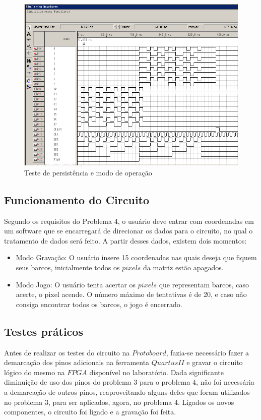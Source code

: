 \documentclass[12pt]{article}
\begin{document}
\begin{figure}[h]
\centering
\includegraphics[width=1\textwidth]{img/testram2.png}
\caption{Teste de persistência e modo de operação}
\label{fig:ramtest2}
\end{figure}

\subsection{Funcionamento do Circuito}
Segundo os requisitos do Problema 4, o usuário deve entrar com coordenadas em um software que se encarregará de direcionar os dados para o circuito, no qual o tratamento de dados será feito. A partir desses dados, existem dois momentos:

\begin{itemize}
\item Modo Gravação: O usuário insere 15 coordenadas nas quais deseja que fiquem seus barcos, inicialmente todos os $pixels$ da matriz estão apagados.
\item Modo Jogo: O usuário tenta acertar os $pixels$ que representam barcos, caso acerte, o pixel acende. O número máximo de tentativas é de 20, e caso não consiga encontrar todos os barcos, o jogo é encerrado.
\end{itemize}

\subsection{Testes práticos}
Antes de realizar os testes do circuito na $Protoboard$, fazia-se necessário fazer a demarcação dos pinos adicionais na ferramenta $Quartus II$ e  gravar o circuito lógico do mesmo na $FPGA$ disponível no laboratório. Dada significante diminuição de uso dos pinos do problema 3 para o problema 4, não foi necessária a demarcação  de outros pinos, reaproveitando alguns deles que foram utilizados no problema 3, para ser aplicados, agora, no problema 4. Ligados os novos componentes, o circuito foi ligado e a gravação foi feita.
\end{document}
